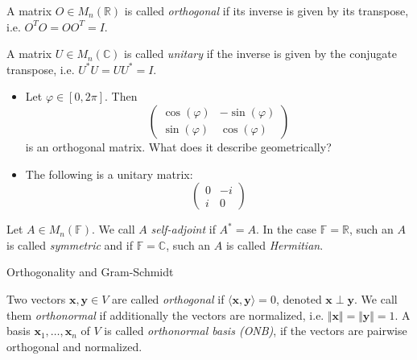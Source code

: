 \documentclass [aspectratio=169]{beamer}
\newcommand{\bx}{{\mathbf{x}}}
\newcommand{\by}{{\mathbf{y}}}
\newcommand{\innerprod}[1]{\langle #1 \rangle}
\newcommand{\R}{{\mathbb{R}}}
\newcommand{\C}{{\mathbb{C}}}
\newcommand{\F}{{\mathbb{F}}}
\begin{document}
\begin{frame}
\begin{definition}
A matrix $O\in M_n(\R)$ is called \emph{orthogonal} if its inverse is given by its transpose, i.e. $O^T O = O O^T = I$. 

\vspace{0.5em}
A matrix $U\in M_n(\C)$ is called \emph{unitary} if the inverse is given by the conjugate transpose, i.e. $U^* U = U U^* = I$.
\end{definition}
\end{frame}


\begin{frame}
\begin{example}
\begin{itemize}
    \item Let $\varphi \in [0,2\pi]$. Then 
    \begin{equation*}
        \begin{pmatrix}
            \cos(\varphi) & -\sin(\varphi) \\
            \sin(\varphi) & \cos(\varphi)
        \end{pmatrix}
    \end{equation*}
    is an orthogonal matrix. What does it describe geometrically?
    \item The following is a unitary matrix:
        \begin{equation*}
        \begin{pmatrix}
            0 & -i \\
            i & 0
        \end{pmatrix}
    \end{equation*}
\end{itemize}
\end{example}
\end{frame}


\begin{frame}
\begin{definition}
Let $A\in M_n(\F)$. We call $A$ \emph{self-adjoint} if $A^* = A$. In the case $\F = \R$, such an $A$ is called \emph{symmetric} and if $\F = \C$, such an $A$ is called \emph{Hermitian}.
\end{definition}
\end{frame}

\begin{frame}{Orthogonality and Gram-Schmidt}
\begin{definition}
Two vectors $\bx,\by \in V$ are called \emph{orthogonal} if $\innerprod{\bx,\by} = 0$, denoted $\bx \perp \by$. We call them \emph{orthonormal} if additionally the vectors are normalized, i.e. $\Vert \bx \Vert =\Vert \by\Vert = 1 $. A basis $\bx_1,\ldots, \bx_n$ of $V$ is called \emph{orthonormal basis (ONB)}, if the vectors are pairwise orthogonal and normalized.  
\end{definition}

\end{frame}
\end{document}
